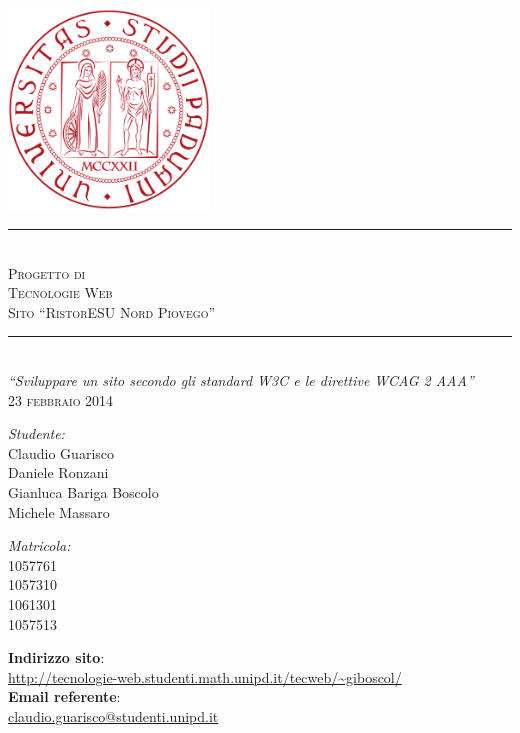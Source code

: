 \documentclass[10pt,a4paper,onecolumn]{article}
\begin{document}
\begin{titlepage}

\begin{center}
 
\textsc{\Large}\\[5cm]

\includegraphics[width=0.4\textwidth]{Logo.png}\\[0.3cm]  
\noindent\rule{\textwidth}{0.4pt} \\[0.3cm]
\textsc{\Huge Progetto di}\\[0.25cm]
\textsc{\Huge Tecnologie Web}\\[0.3cm]
\textsc{\Large Sito ``RistorESU Nord Piovego''}
\noindent\rule{\textwidth}{0.4pt}\\[0.5cm]
\textit{``Sviluppare un sito secondo gli standard W3C e le direttive WCAG 2 AAA''} \\[0.5cm]
\textsc{23 febbraio 2014}\\[0.5cm]
\begin{minipage}{0.4\textwidth}
\begin{flushleft} \large
\emph{Studente:}\\
Claudio Guarisco\\
Daniele Ronzani\\
Gianluca Bariga Boscolo\\
Michele Massaro\\
\end{flushleft}
\end{minipage}
\begin{minipage}{0.4\textwidth}
\begin{flushright} \large
\emph{Matricola:} \\
1057761\\
1057310\\
1061301\\
1057513\\
\end{flushright}
\end{minipage}
\end{center}

\textbf{Indirizzo sito}:\\ \url{http://tecnologie-web.studenti.math.unipd.it/tecweb/~giboscol/}\\

\textbf{Email referente}:\\ \href{mailto:claudio.guarisco@studenti.unipd.it}{claudio.guarisco@studenti.unipd.it}



\end{titlepage}
\end{document}
